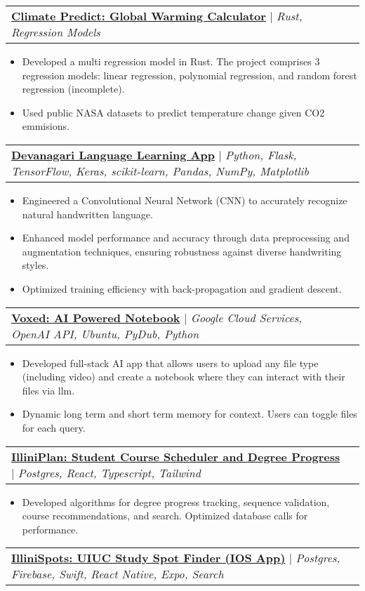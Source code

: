 \documentclass[letterpaper,10.99999999999999pt]{article}
\makeatletter
\newcommand{\resumeItem}[1]{
  \item\small{
    {#1 \vspace{-1pt}}
  }
}
\newcommand{\resumeProjectHeading}[2]{
    \item
    \begin{tabular*}{0.97\textwidth}{l@{\extracolsep{\fill}}r}
      \small#1 & #2 \\
    \end{tabular*}\vspace{-6pt}
}
\newcommand{\resumeItemListStart}{\begin{itemize}}
\newcommand{\resumeItemListEnd}{\end{itemize}\vspace{-5pt}}
\makeatother
\begin{document}
        \resumeProjectHeading
          {\textbf{\href{https://www.aidanandrews.info/projects/climatepredict}{Climate Predict: Global Warming Calculator}} $|$ \emph{Rust, Regression Models}}{}
          \resumeItemListStart
            \resumeItem{Developed a multi regression model in Rust. The project comprises 3 regression models: linear regression, polynomial regression, and random forest regression (incomplete).}
            \resumeItem{Used public NASA datasets to predict temperature change given CO2 emmisions.}
          \resumeItemListEnd
          
      \resumeProjectHeading
          {\textbf{\href{https://www.aidanandrews.info/projects/devanagari-web-app}{Devanagari Language Learning App}} $|$ \emph{Python, Flask, TensorFlow, Keras, scikit-learn, Pandas, NumPy, Matplotlib}}{}
          \resumeItemListStart
            \resumeItem{Engineered a Convolutional Neural Network (CNN) to accurately recognize natural handwritten language.}
            \resumeItem{Enhanced model performance and accuracy through data preprocessing and augmentation techniques, ensuring robustness against diverse handwriting styles.}
            \resumeItem{Optimized training efficiency with back-propagation and gradient descent.}
          \resumeItemListEnd

      \resumeProjectHeading
        {\textbf{\href{https://www.aidanandrews.info/projects/voxed}{Voxed: AI Powered Notebook}} $|$ \emph{Google Cloud Services, OpenAI API, Ubuntu, PyDub, Python}}{}
        \resumeItemListStart
          \resumeItem{Developed full-stack AI app that allows users to upload any file type (including video) and create a notebook where they can interact with their files via llm.}
          \resumeItem{Dynamic long term and short term memory for context. Users can toggle files for each query.}
        \resumeItemListEnd
        
        \resumeProjectHeading
        {\textbf{\href{https://www.aidanandrews.info/projects/illini-plan}{IlliniPlan: Student Course Scheduler and Degree Progress}} $|$ \emph{Postgres, React, Typescript, Tailwind}}{}
        \resumeItemListStart
        \resumeItem{Developed algorithms for degree progress tracking, sequence validation, course recommendations, and search. Optimized database calls for performance.}
        \resumeItemListEnd
        
        \resumeProjectHeading
        {\textbf{\href{https://www.aidanandrews.info/projects/illini-spots}{IlliniSpots: UIUC Study Spot Finder (IOS App)}} $|$ \emph{Postgres, Firebase, Swift, React Native, Expo, Search}}{}
        
\end{document}
